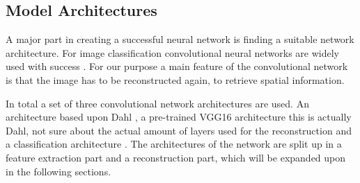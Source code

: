 \subsection{Model Architectures}
A major part in creating a successful neural network is finding a suitable network architecture. For image classification convolutional neural networks are widely used with success \cite{Krizhevsky,Szegedy,Simonyan}. For our purpose a main feature of the convolutional network is that the image has to be reconstructed again, to retrieve spatial information.

{\color{red} 
In total a set of three convolutional network architectures are used. An architecture based upon Dahl \cite{Dahl}, a pre-trained VGG16 \cite{Simonyan} architecture {\color{red} this is actually Dahl,  not sure about the actual amount of layers used for the reconstruction} and a classification architecture \cite{Zhang}. The architectures of the network are split up in a feature extraction part and a reconstruction part, which will be expanded upon in the following sections.}\\ 
\\%

